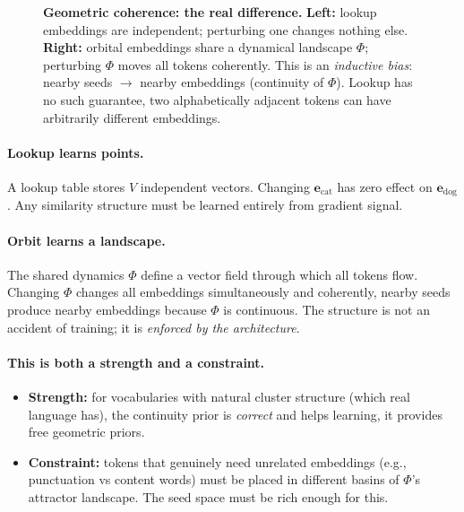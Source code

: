 \documentclass[11pt, a4paper]{article}
\theoremstyle{remark}
\begin{document}
\begin{figure}[h]
\caption{\textbf{Geometric coherence: the real difference.}
\textbf{Left:} lookup embeddings are independent; perturbing one changes nothing else.
\textbf{Right:} orbital embeddings share a dynamical landscape $\Phi$;
perturbing $\Phi$ moves all tokens coherently.
This is an \emph{inductive bias}: nearby seeds $\to$ nearby embeddings (continuity of $\Phi$).
Lookup has no such guarantee, two alphabetically adjacent tokens can have arbitrarily different embeddings.}
\label{fig:coherence}
\end{figure}

\paragraph{Lookup learns points.}
A lookup table stores $V$ independent vectors.
Changing $\mathbf{e}_{\text{cat}}$ has zero effect on $\mathbf{e}_{\text{dog}}$.
Any similarity structure must be learned entirely from gradient signal.

\paragraph{Orbit learns a landscape.}
The shared dynamics $\Phi$ define a vector field through which all tokens flow.
Changing $\Phi$ changes all embeddings simultaneously and coherently, nearby seeds produce nearby embeddings because $\Phi$ is continuous.
The structure is not an accident of training; it is \emph{enforced by the architecture}.

\paragraph{This is both a strength and a constraint.}
\begin{itemize}[nosep]
    \item \textbf{Strength:} for vocabularies with natural cluster structure
          (which real language has), the continuity prior is \emph{correct} and helps
          learning, it provides free geometric priors.
    \item \textbf{Constraint:} tokens that genuinely need unrelated embeddings
          (e.g., punctuation vs content words) must be placed in different basins of $\Phi$'s
          attractor landscape. The seed space must be rich enough for this.
\end{itemize}
\end{document}
